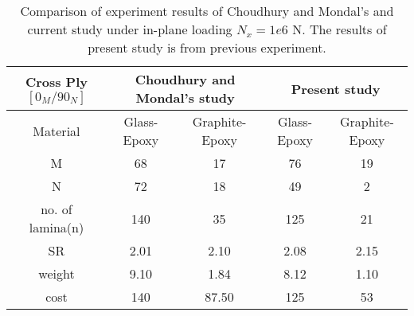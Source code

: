 \begin{table}
\caption{Comparison of experiment results of Choudhury and
Mondal's and current study under in-plane loading
$N_x=1e6$ N. The results of present study is from previous experiment.}
\centering
\begin{adjustbox}{width=1\textwidth}
	\begin{tabular}{c|cc|cc}
		\toprule
		Cross Ply $[0_M/90_N]$         & \multicolumn{2}{c}{Choudhury and Mondal's study} & \multicolumn{2}{c}{Present study} \\
		\midrule																								  
		 Material       &  Glass-Epoxy & Graphite-Epoxy  & Glass-Epoxy & Graphite-Epoxy      \\ 
			  M         &  68          &    17           &  76		    &  19             \\
			  N         &  72          &    18           &  49		    &  2              \\
	no. of lamina(n)    &  140         &    35           &  125	        &  21                     \\
			 SR         &  2.01        &    2.10         &  2.08	    &  2.15            \\
		 weight         &  9.10        &    1.84         &  8.12	    &  1.10           \\
		 cost           &  140         &    87.50        &  125	        &  53           \\
		\bottomrule
	\end{tabular}
\end{adjustbox}
\label{tab:comparsion}
\end{table}
